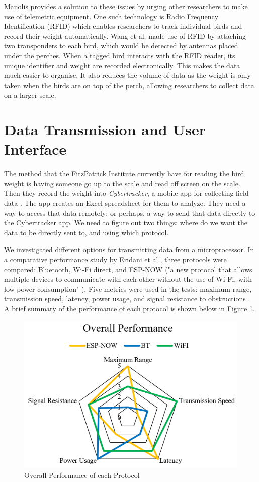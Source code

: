 \documentclass[class=report,11pt,crop=false]{standalone}
\begin{document}
Manolis \cite{manoils2024simple} provides a solution to these issues by urging other researchers to make use of telemetric equipment. One such technology is Radio Frequency Identification (RFID) which enables researchers to track individual birds and record their weight automatically. Wang et al. \cite{wang2019rfid} made use of RFID by attaching two transponders to each bird, which would be detected by antennas placed under the perches. When a tagged bird interacts with the RFID reader, its unique identifier and weight are recorded electronically. This makes the data much easier to organise. It also reduces the volume of data as the weight is only taken when the birds are on top of the perch, allowing researchers to collect data on a larger scale. 


\section{Data Transmission and User Interface}
The method that the FitzPatrick Institute currently have for reading the bird weight is having someone go up to the scale and read off screen on the scale. Then they record the weight into \textit{Cybertracker}, a mobile app for collecting field data \cite{cybertracker}. The app creates an Excel spreadsheet for them to analyze. 
They need a way to access that data remotely; or perhaps, a way to send that data directly to the Cybertracker app. We need to figure out two things: where do we want the data to be directly sent to, and using which protocol.

We investigated different options for transmitting data from a microprocessor. In a comparative performance study by Eridani et al., three protocols were compared: Bluetooth, Wi-Fi direct, and ESP-NOW ("a new protocol that allows multiple devices to communicate with each other without the use of Wi-Fi, with low power consumption" \cite{comparitiveEspnow}). Five metrics were used in the tests: maximum range, transmission speed, latency, power usage, and signal resistance to obstructions \cite{comparitiveEspnow}. A brief summary of the performance of each protocol is shown below in Figure \ref{fig:performance}.
\begin{figure}[h]
	\centering
	\includegraphics[width=0.7\linewidth]{Figures/performance}
	\caption{Overall Performance of each Protocol \cite{comparitiveEspnow}}
	\label{fig:performance}
\end{figure}
\end{document}
